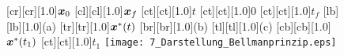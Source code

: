 	
	
\begin{figure}[h]
	[cr][cr][1.0]{$\boldsymbol{x}_0$}
	[cl][cl][1.0]{$\boldsymbol{x}_f$}
	[ct][ct][1.0]{$t$}
	[ct][ct][1.0]{$0$}
	[ct][ct][1.0]{$t_f$}
	[lb][lb][1.0]{(a)}
	[tr][tr][1.0]{$\boldsymbol{x}^\ast(t)$}
	[br][br][1.0]{(b)}
	[tl][tl][1.0]{(c)}
	[cb][cb][1.0]{$\boldsymbol{x}^\ast(t_1)$}
	[ct][ct][1.0]{$t_1$}
	\centering
 \texttt{[image: 7\_Darstellung\_Bellmanprinzip.eps]}
	\label{fig:Darstellung_Bellmanprinzip}
\end{figure} 









\newpage












